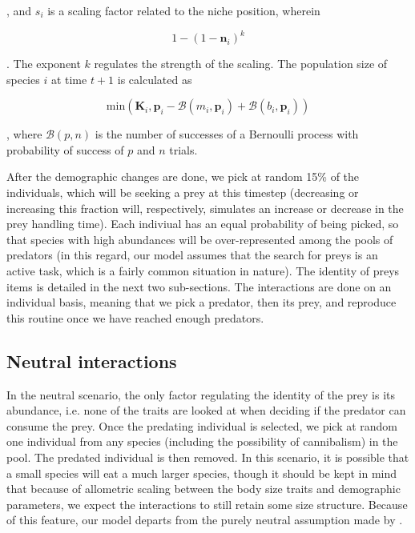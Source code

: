 \documentclass[10pt,twocolumn,fleqn]{article}
\begin{document}
\noindent, and $s_i$ is a scaling factor related to the niche position, wherein

\begin{equation}
	1-(1-\mathbf{n}_i)^k
\end{equation}

\noindent. The exponent $k$ regulates the strength of the scaling. The
population size of species $i$ at time $t+1$ is calculated as

\begin{equation}
	\mathrm{min}(\mathbf{K}_i, \mathbf{p}_i - \mathcal{B}(m_i, \mathbf{p}_i) + \mathcal{B}(b_i, \mathbf{p}_i))
\end{equation}

\noindent, where $\mathcal{B}(p,n)$ is the number of successes of a Bernoulli
process with probability of success of $p$ and $n$ trials.

After the demographic changes are done, we pick at random 15\% of the
individuals, which will be seeking a prey at this timestep (decreasing or
increasing this fraction will, respectively, simulates an increase or decrease
in the prey handling time). Each indiviual has an equal probability of being
picked, so that species with high abundances will be over-represented among the
pools of predators (in this regard, our model assumes that the search for preys
is an active task, which is a fairly common situation in nature). The identity
of preys items is detailed in the next two sub-sections. The interactions are
done on an individual basis, meaning that we pick a predator, then its prey, and
reproduce this routine once we have reached enough predators.

\subsection{Neutral interactions}

In the neutral scenario, the only factor regulating the identity of the prey
is its abundance, i.e. none of the traits are looked at when deciding if the
predator can consume the prey. Once the predating individual is selected, we pick at random
one individual from any species (including the possibility of cannibalism) in
the pool. The predated individual is then removed. In this scenario, it is
possible that a small species will eat a much larger species, though it should
be kept in mind that because of allometric scaling between the body size traits
and demographic parameters, we expect the interactions to still retain some size
structure. Because of this feature, our model departs from the purely neutral
assumption made by \citet{canard_emergence_2012}.
\end{document}
